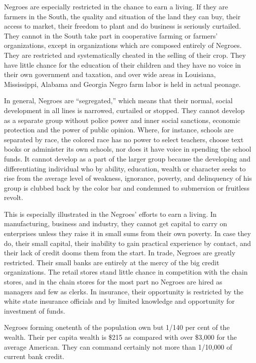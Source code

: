 \documentclass[letterpaper,10pt,english]{jupyterBook}
\begin{document}
\sphinxAtStartPar
Negroes are especially restricted in the chance to earn a living. If they are farmers in the South, the quality and situation of the land they can buy, their access to market, their freedom to plant and do business is seriously curtailed. They cannot in the South take part in co\sphinxhyphen{}operative farming or farmers’ organizations, except in organizations which are composed entirely of Negroes. They are restricted and systematically cheated in the selling of their crop. They have little chance for the education of their children and they have no voice in their own government and taxation, and over wide areas in Louisiana, Mississippi, Alabama and Georgia Negro farm labor is held in actual peonage.

\sphinxAtStartPar
In general, Negroes are “segregated,” which means that their normal, social development in all lines is narrowed, curtailed or stopped. They cannot develop as a separate group without police power and inner social sanctions, economic protection and the power of public opinion. Where, for instance, schools are separated by race, the colored race has no power to select teachers,  choose text books or administer its own schools, nor does it have voice in spending the school funds. It cannot develop as a part of the larger group because the developing and differentiating individual who by ability, education, wealth or character seeks to rise from the average level of weakness, ignorance, poverty, and delinquency of his group is clubbed back by the color bar and condemned to submersion or fruitless revolt.

\sphinxAtStartPar
This is especially illustrated in the Negroes’ efforts to earn a living. In manufacturing, business and industry, they cannot get capital to carry on enterprises unless they raise it in small sums from their own poverty. In case they do, their small capital, their inability to gain practical experience by contact, and their lack of credit dooms them from the start. In trade, Negroes are greatly restricted. Their small banks are entirely at the mercy of the big credit organizations. The retail stores stand little chance in competition with the chain stores, and in the chain stores for the most part no Negroes are hired as managers and few as clerks. In insurance, their opportunity is restricted by the white state insurance officials and by limited knowledge and opportunity for investment of funds.

\sphinxAtStartPar
Negroes forming one\sphinxhyphen{}tenth of the population own but 1/140 per cent of the wealth. Their per capita wealth is \$215 as compared with over \$3,000 for the average American. They can command certainly not more than 1/10,000 of current bank credit.
\end{document}

